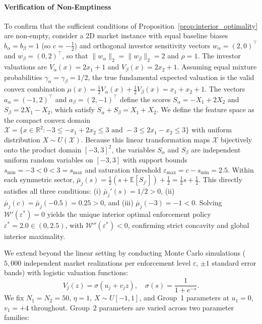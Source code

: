 \paragraph{Verification of Non-Emptiness}
To confirm that the sufficient conditions of Proposition~\ref{prop:interior_optimality} are non-empty, consider a 2D market instance with equal baseline biases $b_\alpha = b_\beta = 1$ (so $c = -\frac{1}{2}$) and orthogonal investor sensitivity vectors $w_\alpha = (2, 0)^\top$ and $w_\beta = (0, 2)^\top$, so that $\|w_\alpha\|_2 = \|w_\beta\|_2 = 2$ and $\rho = 1$. The investor valuations are $V_\alpha(x) = 2x_1 + 1$ and $V_\beta(x) = 2x_2 + 1$. Assuming equal mixture probabilities $\gamma_\alpha = \gamma_\beta = 1/2$, the true fundamental expected valuation is the valid convex combination $\mu(x) = \frac{1}{2}V_\alpha(x) + \frac{1}{2}V_\beta(x) = x_1 + x_2 + 1$. The vectors $a_\alpha = (-1, 2)^\top$ and $a_\beta = (2, -1)^\top$ define the scores $S_\alpha = -X_1 + 2X_2$ and $S_\beta = 2X_1 - X_2$, which satisfy $S_\alpha + S_\beta = X_1 + X_2$. We define the feature space as the compact convex domain $\mathcal{X} = \{x \in \mathbb{R}^2 : -3 \le -x_1 + 2x_2 \le 3 \text{ and } -3 \le 2x_1 - x_2 \le 3\}$ with uniform distribution $X \sim U(\mathcal{X})$. Because this linear transformation maps $\mathcal{X}$ bijectively onto the product domain $[-3, 3]^2$, the variables $S_\alpha$ and $S_\beta$ are independent uniform random variables on $[-3, 3]$ with support bounds $s_{\min} = -3 < 0 < 3 = s_{\max}$ and saturation threshold $\varepsilon_{\max} = c - s_{\min} = 2.5$. Within each symmetric sector, $\bar{\mu}_j(s) = \frac{1}{2}(s + \mathbb{E}[S_{j'}]) + \frac{1}{2} = \frac{1}{2}s + \frac{1}{2}$. This directly satisfies all three conditions: (i) $\bar{\mu}_j'(s) = 1/2 > 0$, (ii) $\bar{\mu}_j(c) = \bar{\mu}_j(-0.5) = 0.25 > 0$, and (iii) $\bar{\mu}_j(-3) = -1 < 0$. Solving $\mathcal{W}'(\varepsilon^*) = 0$ yields the unique interior optimal enforcement policy $\varepsilon^* = 2.0 \in (0, 2.5)$, with $\mathcal{W}''(\varepsilon^*) < 0$, confirming strict concavity and global interior maximality.



We extend beyond the linear setting by conducting Monte Carlo simulations ($5{,}000$ independent market realizations per enforcement level $\varepsilon$, $\pm 1$ standard error bands) with logistic valuation functions:
\begin{equation}
  V_j(z) = \sigma(u_j + v_j z), \quad \sigma(s) = \frac{1}{1+e^{-s}}.
\end{equation}
We fix $N_1=N_2=50$, $\eta=1$, $X\sim U[-1,1]$, and Group~1 parameters at $u_1=0$, $v_1=+4$ throughout. Group~2 parameters are varied across two parameter families:

